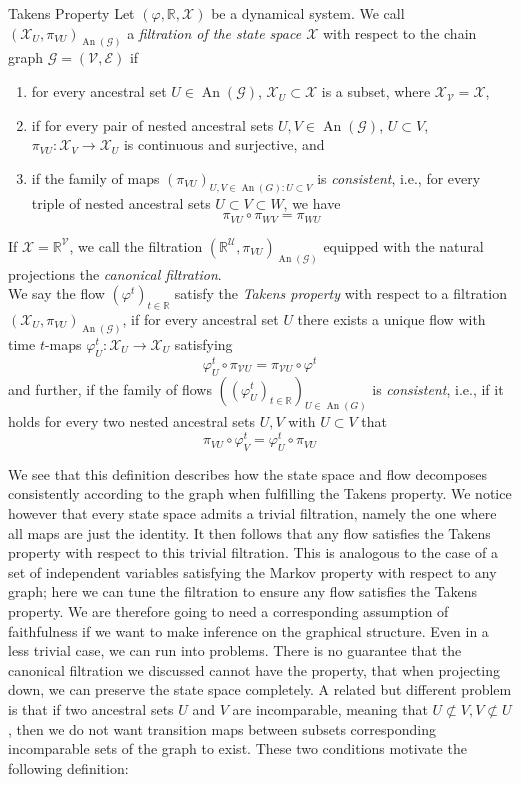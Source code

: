 \documentclass[11pt, a4paper]{memoir}
\theoremstyle{break}
\theoremstyle{break}
\theoremstyle{nonumberplain}
\newcommand{\mR}{\mathbb{R}}
\DeclareMathOperator{\an}{An}
\begin{document}
\begin{mydefinition}{Takens Property}
Let $(\varphi,\mR,\mathcal{X})$ be a dynamical system. We call $(\mathcal{X}_U,\pi_{VU})_{\an(\mathcal{G})}$ a \emph{filtration of the state space $\mathcal{X}$} with respect to the chain graph $\mathcal{G}=(\mathcal{V},\mathcal{E})$ if
\begin{enumerate}[label=\roman*)]
\item for every ancestral set $U\in \an(\mathcal{G})$, $\mathcal{X}_U\subset \mathcal{X}$ is a subset, where $\mathcal{X}_{\mathcal{V}}=\mathcal{X}$,
\item if for every pair of nested ancestral sets $U,V\in \an(\mathcal{G})$, $U\subset V$, $\pi_{VU}:\mathcal{X}_V\to \mathcal{X}_U$ is continuous and surjective, and
\item if the family of maps $(\pi_{VU})_{U,V\in \an(G): U\subset V}$ is \emph{consistent}, i.e., for every triple of nested ancestral sets $U\subset V\subset W$, we have
$$\pi_{VU}\circ \pi_{WV}=\pi_{WU}$$
\end{enumerate}
If $\mathcal{X}=\mR^\mathcal{V}$, we call the filtration $(\mR^{\mathcal{U}},\pi_{VU})_{\an(\mathcal{G})}$ equipped with the natural projections the \emph{canonical filtration}.\\[5pt]
We say the flow $(\varphi^t)_{t\in \mR}$ satisfy the \emph{Takens property} with respect to a filtration $(\mathcal{X}_U,\pi_{VU})_{\an(\mathcal{G})}$, if for every ancestral set $U$ there exists a unique flow with time $t$-maps $\varphi^t_U: \mathcal{X}_U\to\mathcal{X}_U$ satisfying
$$\varphi^t_{U}\circ \pi_{\mathcal{V}U}=\pi_{\mathcal{V}U}\circ \varphi^t$$
and further, if the family of flows $((\varphi_U^t)_{t\in \mR})_{U\in \an(G)}$ is \emph{consistent}, i.e., if it holds for every two nested ancestral sets $U,V$ with $U\subset V$ that
$$\pi_{VU}\circ\varphi_V^t=\varphi_U^t\circ \pi_{VU}$$
\end{mydefinition}
We see that this definition describes how the state space and flow decomposes consistently according to the graph when fulfilling the Takens property. We notice however that every state space admits a trivial filtration, namely the one where all maps are just the identity. It then follows that any flow satisfies the Takens property with respect to this trivial filtration. This is analogous to the case of a set of independent variables satisfying the Markov property with respect to any graph; here we can tune the filtration to ensure any flow satisfies the Takens property. We are therefore going to need a corresponding assumption of faithfulness if we want to make inference on the graphical structure. Even in a less trivial case, we can run into problems. There is no guarantee that the canonical filtration we discussed cannot have the property, that when projecting down, we can preserve the state space completely. A related but different problem is that if two ancestral sets $U$ and $V$ are incomparable, meaning that $U\not\subset V, V\not\subset U$, then we do not want transition maps between subsets corresponding incomparable sets of the graph to exist. These two conditions motivate the following definition:
\end{document}
